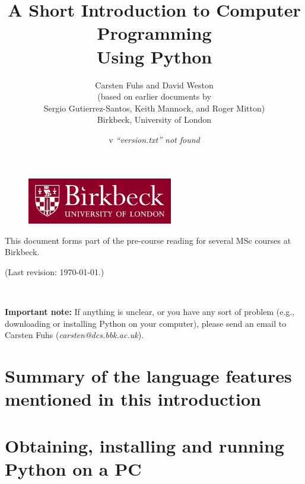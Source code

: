 \documentclass[11pt,a4paper]{article}
\title{A Short Introduction to Computer Programming\\
  Using Python}
\author{Carsten Fuhs and David Weston\\
  (based on earlier documents by\\
  Sergio Gutierrez-Santos, Keith Mannock, and Roger Mitton)\\
  Birkbeck, University of London}
\date{\InputIfFileExists{version.txt}
     {v}
     {\emph{``version.txt'' not found}}}
\begin{document}

\maketitle

\thispagestyle{empty}

\vfill 

\begin{figure}[h!]  %
  \centering
  \includegraphics[height=2cm]{Birkbeck-Logo-Colour-330x104.jpg}
\end{figure}

\vfill

\noindent This document forms part of the pre-course reading for
several MSc courses at Birkbeck.


\noindent (Last revision: \today.)


\newpage

~\vspace{8cm}

\textbf{Important note: } If anything is unclear, or you have any 
sort of problem (e.g.,
downloading or installing Python on your computer), please send an
email to Carsten Fuhs (\emph{carsten@dcs.bbk.ac.uk}).
\newpage


\newpage


\newpage


\newpage


\newpage


\newpage

\section{Summary of the language features mentioned in this introduction}
\label{sec:summ-lang-feat}

\newpage

% 

\section{Obtaining, installing and running Python on a PC}
\label{sec:obta-inst-runn}

\newpage


\end{document}
